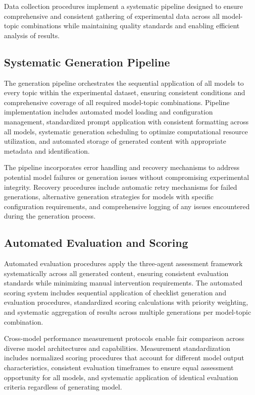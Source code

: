 Data collection procedures implement a systematic pipeline designed to ensure comprehensive and consistent gathering of experimental data across all model-topic combinations while maintaining quality standards and enabling efficient analysis of results.

\subsection{Systematic Generation Pipeline}

The generation pipeline orchestrates the sequential application of all models to every topic within the experimental dataset, ensuring consistent conditions and comprehensive coverage of all required model-topic combinations. Pipeline implementation includes automated model loading and configuration management, standardized prompt application with consistent formatting across all models, systematic generation scheduling to optimize computational resource utilization, and automated storage of generated content with appropriate metadata and identification.

The pipeline incorporates error handling and recovery mechanisms to address potential model failures or generation issues without compromising experimental integrity. Recovery procedures include automatic retry mechanisms for failed generations, alternative generation strategies for models with specific configuration requirements, and comprehensive logging of any issues encountered during the generation process.

\subsection{Automated Evaluation and Scoring}

Automated evaluation procedures apply the three-agent assessment framework systematically across all generated content, ensuring consistent evaluation standards while minimizing manual intervention requirements. The automated scoring system includes sequential application of checklist generation and evaluation procedures, standardized scoring calculations with priority weighting, and systematic aggregation of results across multiple generations per model-topic combination.

Cross-model performance measurement protocols enable fair comparison across diverse model architectures and capabilities. Measurement standardization includes normalized scoring procedures that account for different model output characteristics, consistent evaluation timeframes to ensure equal assessment opportunity for all models, and systematic application of identical evaluation criteria regardless of generating model.

